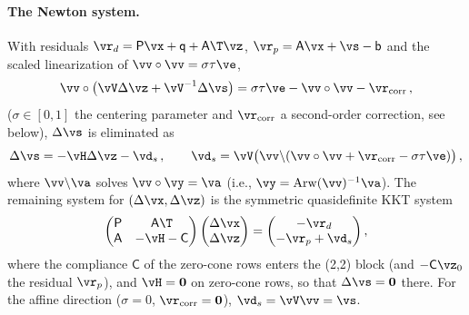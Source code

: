 \paragraph{The Newton system.} With residuals $\vr_d = \mathsf{P}\vx + \mathsf{q} + \mathsf{A}\T\vz$, $\vr_p = \mathsf{A}\vx + \vs - \mathsf{b}$ and the scaled linearization of $\vv\circ\vv = \sigma\tau\ve$,
%
\begin{equation}\label{eq:ec_scaled_lin}
	\vv\circ\big(\vV\Delta\vz + \vV^{-1}\Delta\vs\big) = \sigma\tau\ve - \vv\circ\vv - \vr_{\mathrm{corr}} \, ,
\end{equation}
%
($\sigma \in [0, 1]$ the centering parameter and $\vr_{\mathrm{corr}}$ a second-order correction, see below), $\Delta\vs$ is eliminated as
%
\begin{equation}\label{eq:ec_ds}
	\Delta\vs = -\vH\Delta\vz - \vd_s \, , \qquad
	\vd_s = \vV\big(\vv \backslash (\vv\circ\vv + \vr_{\mathrm{corr}} - \sigma\tau\ve)\big) \, ,
\end{equation}
%
where $\vv \backslash \va$ solves $\vv\circ\vy = \va$ (i.e., $\vy = \operatorname{Arw}(\vv)^{-1}\va$). The remaining system for $(\Delta\vx, \Delta\vz)$ is the symmetric quasidefinite KKT system
%
\begin{equation}\label{eq:ec_kkt_matrix}
	\begin{pmatrix} \mathsf{P} & \mathsf{A}\T \\ \mathsf{A} & -\vH - \mathsf{C} \end{pmatrix}
	\begin{pmatrix} \Delta\vx \\ \Delta\vz \end{pmatrix}
	= \begin{pmatrix} -\vr_d \\ -\vr_p + \vd_s \end{pmatrix} ,
\end{equation}
%
where the compliance $\mathsf{C}$ of the zero-cone rows enters the (2,2) block (and $-\mathsf{C}\vz_0$ the residual $\vr_p$), and $\vH = \mathbf{0}$ on zero-cone rows, so that $\Delta\vs = \mathbf{0}$ there. For the affine direction ($\sigma = 0$, $\vr_{\mathrm{corr}} = \mathbf{0}$), $\vd_s = \vV\vv = \vs$.
%
